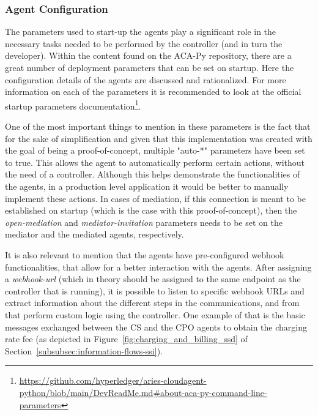 \subsubsection{Agent Configuration}
\label{subsubsec:agent_configuration}

The parameters used to start-up the agents play a significant role in the necessary tasks needed to be performed by the controller (and in turn the developer). Within the content found on the ACA-Py repository, there are a great number of deployment parameters that can be set on startup. Here the configuration details of the agents are discussed and rationalized. For more information on each of the parameters it is recommended to look at the official startup parameters documentation\footnote{\url{https://github.com/hyperledger/aries-cloudagent-python/blob/main/DevReadMe.md\#about-aca-py-command-line-parameters}}. 

One of the most important things to mention in these parameters is the fact that for the sake of simplification and given that this implementation was created with the goal of being a proof-of-concept, multiple "auto-*" parameters have been set to true. This allows the agent to automatically perform certain actions, without the need of a controller. Although this helps demonstrate the functionalities of the agents, in a production level application it would be better to manually implement these actions.
In cases of mediation, if this connection is meant to be established on startup (which is the case with this proof-of-concept), then the \textit{open-mediation} and \textit{mediator-invitation} parameters needs to be set on the mediator and the mediated agents, respectively.

It is also relevant to mention that the agents have pre-configured webhook functionalities, that allow for a better interaction with the agents. After assigning a \textit{webhook-url} (which in theory should be assigned to the same endpoint as the controller that is running), it is possible to listen to specific webhook URLs and extract information about the different steps in the communications, and from that perform custom logic using the controller. One example of that is the basic messages exchanged between the CS and the CPO agents to obtain the charging rate fee (as depicted in Figure~\ref{fig:charging_and_billing_ssd} of Section~\ref{subsubsec:information-flows-ssi}).

